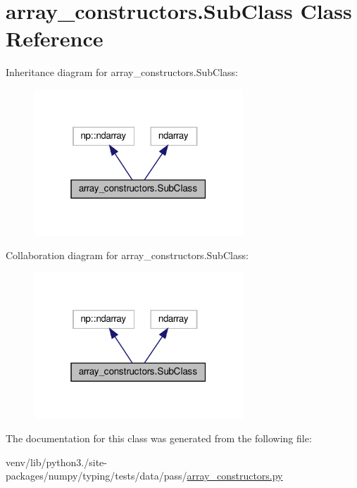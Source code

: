 \hypertarget{classarray__constructors_1_1SubClass}{}\section{array\+\_\+constructors.\+Sub\+Class Class Reference}
\label{classarray__constructors_1_1SubClass}


Inheritance diagram for array\+\_\+constructors.\+Sub\+Class\+:
\nopagebreak
\begin{figure}[H]
\begin{center}
\leavevmode
\includegraphics[width=223pt]{classarray__constructors_1_1SubClass__inherit__graph}
\end{center}
\end{figure}


Collaboration diagram for array\+\_\+constructors.\+Sub\+Class\+:
\nopagebreak
\begin{figure}[H]
\begin{center}
\leavevmode
\includegraphics[width=223pt]{classarray__constructors_1_1SubClass__coll__graph}
\end{center}
\end{figure}


The documentation for this class was generated from the following file\+:\begin{DoxyCompactItemize}
\item 
venv/lib/python3./site-\/packages/numpy/typing/tests/data/pass/\hyperlink{pass_2array__constructors_8py}{array\+\_\+constructors.\+py}\end{DoxyCompactItemize}

